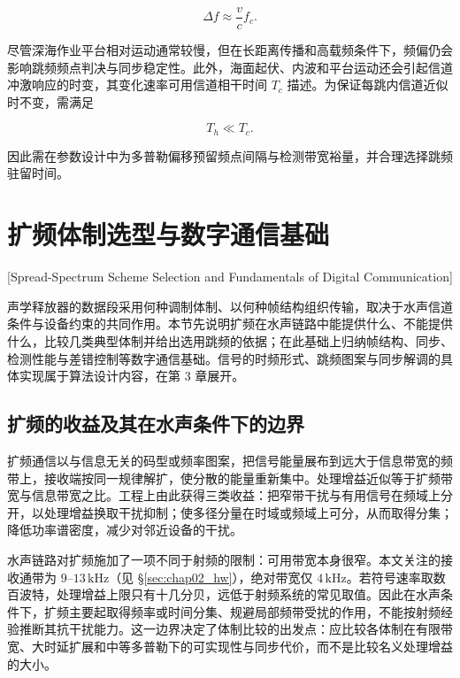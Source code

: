 \begin{equation}
  \Delta f \approx \frac{v}{c}f_c.
  \label{eq:doppler}
\end{equation}

尽管深海作业平台相对运动通常较慢，但在长距离传播和高载频条件下，频偏仍会影响跳频频点判决与同步稳定性。此外，海面起伏、内波和平台运动还会引起信道冲激响应的时变，其变化速率可用信道相干时间 $T_c$ 描述。为保证每跳内信道近似时不变，需满足

\begin{equation}
  T_h \ll T_c.
  \label{eq:slow_fading}
\end{equation}

因此需在参数设计中为多普勒偏移预留频点间隔与检测带宽裕量，并合理选择跳频驻留时间。

\section{扩频体制选型与数字通信基础}[Spread-Spectrum Scheme Selection and Fundamentals of Digital Communication]

声学释放器的数据段采用何种调制体制、以何种帧结构组织传输，取决于水声信道条件与设备约束的共同作用。本节先说明扩频在水声链路中能提供什么、不能提供什么，比较几类典型体制并给出选用跳频的依据；在此基础上归纳帧结构、同步、检测性能与差错控制等数字通信基础。信号的时频形式、跳频图案与同步解调的具体实现属于算法设计内容，在第 3 章展开。

\subsection{扩频的收益及其在水声条件下的边界}

扩频通信以与信息无关的码型或频率图案，把信号能量展布到远大于信息带宽的频带上，接收端按同一规律解扩，使分散的能量重新集中。处理增益近似等于扩频带宽与信息带宽之比。工程上由此获得三类收益：把窄带干扰与有用信号在频域上分开，以处理增益换取干扰抑制；使多径分量在时域或频域上可分，从而取得分集；降低功率谱密度，减少对邻近设备的干扰。

水声链路对扩频施加了一项不同于射频的限制：可用带宽本身很窄。本文关注的接收通带为 $9$--$13\,\mathrm{kHz}$（见 \S\ref{sec:chap02_hw}），绝对带宽仅 $4\,\mathrm{kHz}$。若符号速率取数百波特，处理增益上限只有十几分贝，远低于射频系统的常见取值。因此在水声条件下，扩频主要起取得频率或时间分集、规避局部频带受扰的作用，不能按射频经验推断其抗干扰能力。这一边界决定了体制比较的出发点：应比较各体制在有限带宽、大时延扩展和中等多普勒下的可实现性与同步代价，而不是比较名义处理增益的大小。

